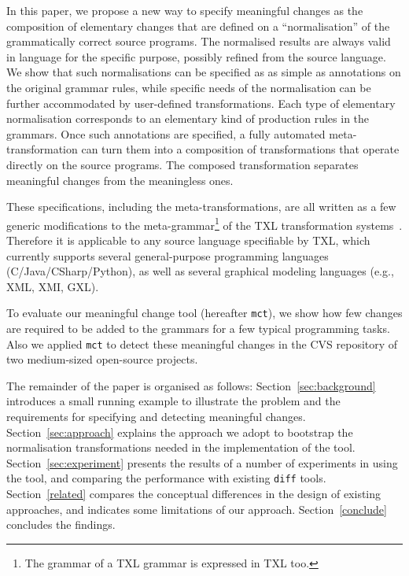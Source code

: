 \documentclass[10pt, conference, compsocconf]{IEEEtran}
\begin{document}
In this paper, we propose a new way to specify meaningful changes as the composition of elementary changes that are defined on a ``normalisation'' of the grammatically correct source programs. The normalised results are always valid in language for the specific purpose, possibly refined from the source language. We show that such normalisations can be specified as as simple as annotations on the original grammar rules, while specific needs of the normalisation can be further accommodated by user-defined transformations. Each type of elementary normalisation corresponds to an elementary kind of production rules in the grammars. Once such annotations are specified, a fully automated meta-transformation can turn them into a composition of transformations that operate directly on the source programs. The composed transformation separates meaningful changes from the meaningless ones.

These specifications, including the meta-transformations, are all written as a few generic modifications to the meta-grammar\footnote{The grammar of a TXL grammar is expressed in TXL too.} of the TXL transformation systems~\cite{txl}. Therefore it is applicable to any source language specifiable by TXL, which currently supports several general-purpose programming languages (C/Java/CSharp/Python), as well as several graphical modeling languages (e.g., XML, XMI, GXL). 

To evaluate our meaningful change tool  (hereafter {\tt mct}), we show how few changes are required to be added to the grammars for a few typical programming tasks. Also we applied {\tt mct} to detect these meaningful changes in the CVS repository of two medium-sized open-source projects.  
   
The remainder of the paper is organised as follows: Section~\ref{sec:background} introduces a small running example to illustrate the problem and the requirements for specifying and detecting meaningful changes. Section~\ref{sec:approach} explains the approach we adopt to bootstrap the normalisation transformations needed in the implementation of the tool. 
Section~\ref{sec:experiment} presents the results of a number of experiments in using the tool, and comparing the performance with existing {\tt diff} tools. Section~\ref{related} compares the conceptual differences in the design of existing approaches, and indicates some limitations of our approach. Section~\ref{conclude} concludes the findings.
\end{document}
